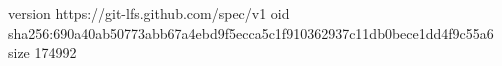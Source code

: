 version https://git-lfs.github.com/spec/v1
oid sha256:690a40ab50773abb67a4ebd9f5ecca5c1f910362937c11db0bece1dd4f9c55a6
size 174992
